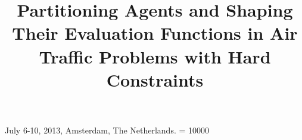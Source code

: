 \documentclass{sig-alternate}
\begin{document}
   {July 6-10, 2013, Amsterdam, The Netherlands.}
    \widowpenalty = 10000






\title{Partitioning Agents and Shaping Their Evaluation Functions in Air Traffic Problems with Hard Constraints}

\end{document}
